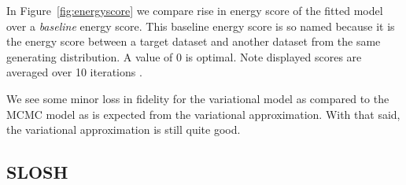     In Figure~\ref{fig:energyscore} we compare rise in energy score of the fitted
    model over a \emph{baseline} energy score.  This baseline energy score is so
    named because it is the energy score between a target dataset and another
    dataset from the same generating distribution.  A value of 0 is optimal.
      Note displayed scores are 
    averaged over 10 iterations .
    
    We see some minor loss in fidelity for the variational model as compared to 
    the MCMC model as is expected from the variational approximation.  With that
    said, the variational approximation is still quite good.

\subsection{SLOSH}


